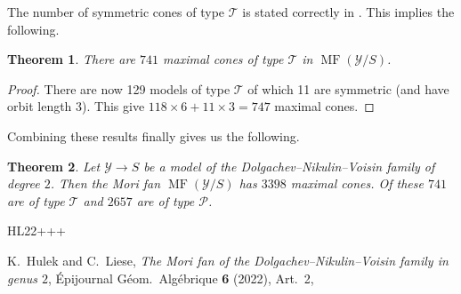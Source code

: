 \documentclass[11pt]{amsart}
\numberwithin{equation}{section}
\theoremstyle{plain}
\newtheorem{theorem}{Theorem}[section]
\theoremstyle{remark}
\newcommand {\Morifan}{\operatorname{MF}}
\newcommand{\sY}{{\mathcal Y}}
\newcommand{\T}{\mathscr{T}\!}
\begin{document}
The number of symmetric cones of type $\T$ is stated correctly in \cite[Theorem~7.14]{HL22}. This implies the following. 

\begin{theorem}\label{maxconesT}  There are $741$ maximal cones of type $\T$ in $\Morifan(\mathscr{Y}/S)$.
\end{theorem}

\begin{proof}
There are now 129 models of type $\T$ of which 11 are symmetric (and have orbit length 3). This give $118 \times 6 + 11 \times 3= 747$ maximal cones.
\end{proof}

Combining these results finally gives us the following. 

\begin{theorem}\label{finalsum}
Let $\sY \to S$ be a model of the Dolgachev--Nikulin--Voisin family of degree $2$. Then the Mori fan $\Morifan(\sY/S)$ has $3398$ maximal cones. Of these $741$ are of type $\T$ and $2657$ are of type $\mathscr{P}$.
\end{theorem}




\begin{thebibliography}{HL22+++}

K.~Hulek and C.~Liese,
\emph{The {M}ori fan of the {D}olgachev--{N}ikulin--{V}oisin family in genus
  $2$}, 
\'{E}pijournal G\'{e}om.\ Alg\'{e}brique \textbf{6} (2022), Art.~2,

\end{thebibliography}
\end{document}
